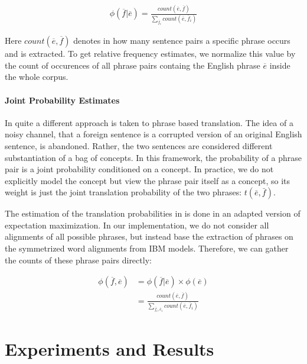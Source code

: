 \documentclass[11pt]{article}
\begin{document}
\begin{align*}
\phi(\overline{f}|\overline{e}) = \frac{count(\overline{e}, \overline{f})}{\sum_{\overline{f}_i} count(\overline{e},\overline{f}_i)}
\end{align*}

Here $count(\overline{e}, \overline{f})$ denotes in how many sentence pairs a specific phrase occurs and is extracted. To get relative frequency estimates, we normalize this value by the count of occurences of all phrase pairs containg the English phrase $\overline{e}$ inside the whole corpus.


\paragraph{Joint Probability Estimates}
In \cite{marcu2002} quite a different approach is taken to phrase based translation. The idea of a noisy channel, that a foreign sentence is a corrupted version of an original English sentence, is abandoned. Rather, the two sentences are considered different substantiation of a bag of concepts. In this framework, the probability of a phrase pair is a joint probability conditioned on a concept. In practice, we do not explicitly model the concept but view the phrase pair itself as a concept, so its weight is just the joint translation probability of the two phrases: $t(\bar{e},\bar{f})$.

The estimation of the translation probabilities in \cite{marcu2002} is done in an adapted version of expectation maximization. 
In our implementation, we do not consider all alignments of all possible phrases, but instead base the extraction of phrases on the symmetrized word alignments from IBM models. Therefore, we can gather the counts of these phrase pairs directly:

\begin{align*}
\phi(\overline{f},\overline{e}) &=\phi(\overline{f}|\overline{e}) \times \phi(\overline{e}) \\
&=\frac{count(\overline{e}, \overline{f})}{\sum_{\overline{f}_i, \overline{e}_i} count(\overline{e},\overline{f}_i)}
\end{align*}


\section{Experiments and Results}
\label{Eval}
\end{document}
